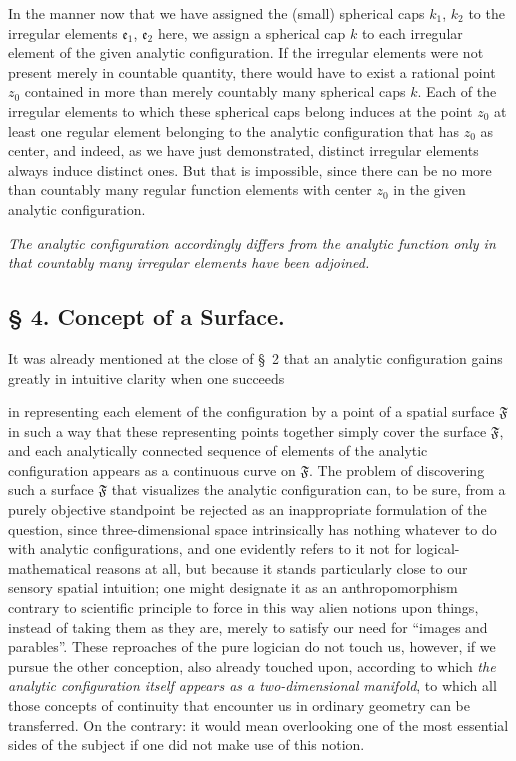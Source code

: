 \documentclass{article}
\begin{document}
In the manner now that we have assigned the (small) spherical caps $k_1$, $k_2$ to the irregular elements $\mathfrak{e}_1$, $\mathfrak{e}_2$ here, we assign a spherical cap $k$ to each irregular element of the given analytic configuration. If the irregular elements were not present merely in countable quantity, there would have to exist a rational point $z_0$ contained in more than merely countably many spherical caps $k$. Each of the irregular elements to which these spherical caps belong induces at the point $z_0$ at least one regular element belonging to the analytic configuration that has $z_0$ as center, and indeed, as we have just demonstrated, distinct irregular elements always induce distinct ones. But that is impossible, since there can be no more than countably many regular function elements with center $z_0$ in the given analytic configuration.

\emph{The analytic configuration accordingly differs from the analytic function only in that countably many irregular elements have been adjoined.}

\subsection*{§ 4. Concept of a Surface.}

It was already mentioned at the close of §~2 that an analytic configuration gains greatly in intuitive clarity when one succeeds

in representing each element of the configuration by a point of a spatial surface $\mathfrak{F}$ in such a way that these representing points together simply cover the surface $\mathfrak{F}$, and each analytically connected sequence of elements of the analytic configuration appears as a continuous curve on $\mathfrak{F}$. The problem of discovering such a surface $\mathfrak{F}$ that visualizes the analytic configuration can, to be sure, from a purely objective standpoint be rejected as an inappropriate formulation of the question, since three-dimensional space intrinsically has nothing whatever to do with analytic configurations, and one evidently refers to it not for logical-mathematical reasons at all, but because it stands particularly close to our sensory spatial intuition; one might designate it as an anthropomorphism contrary to scientific principle to force in this way alien notions upon things, instead of taking them as they are, merely to satisfy our need for ``images and parables''. These reproaches of the pure logician do not touch us, however, if we pursue the other conception, also already touched upon, according to which \emph{the analytic configuration itself appears as a two-dimensional manifold}, to which all those concepts of continuity that encounter us in ordinary geometry can be transferred. On the contrary: it would mean overlooking one of the most essential sides of the subject if one did not make use of this notion.
\end{document}
